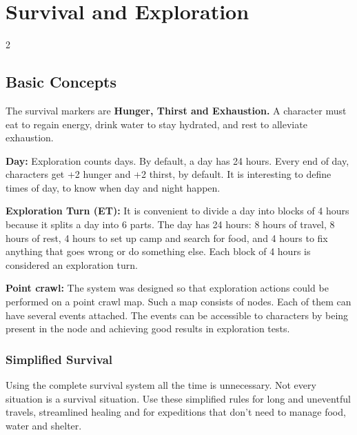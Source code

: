 \chapter{Survival and Exploration}
\begin{multicols}{2}

\section{Basic Concepts}

The survival markers are \textbf{Hunger, Thirst and Exhaustion.} A character must eat to regain energy, drink water to stay hydrated, and rest to alleviate exhaustion.

\textbf{Day:} Exploration counts days. By default, a day has 24 hours. Every end of day, characters get +2 hunger and +2 thirst, by default. It is interesting to define times of day, to know when day and night happen.

\textbf{Exploration Turn (ET):} It is convenient to divide a day into blocks of 4 hours because it splits a day into 6 parts. The day has 24 hours: 8 hours of travel, 8 hours of rest, 4 hours to set up camp and search for food, and 4 hours to fix anything that goes wrong or do something else. Each block of 4 hours is considered an exploration turn. 

\textbf{Point crawl:} The system was designed so that exploration actions could be performed on a point crawl map. Such a map consists of nodes. Each of them can have several events attached. The events can be accessible to characters by being present in the node and achieving good results in exploration tests.

\subsection{Simplified Survival}

Using the complete survival system all the time is unnecessary. Not every situation is a survival situation. Use these simplified rules for long and uneventful travels, streamlined healing and for expeditions that don't need to manage food, water and shelter.


\end{multicols}
